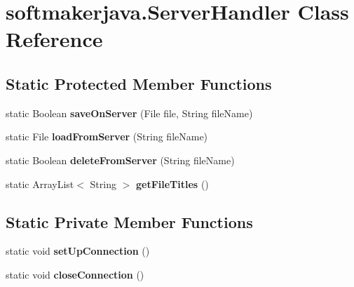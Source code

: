 \hypertarget{classsoftmakerjava_1_1_server_handler}{}\section{softmakerjava.\+Server\+Handler Class Reference}
\label{classsoftmakerjava_1_1_server_handler}
\subsection*{Static Protected Member Functions}
\begin{DoxyCompactItemize}
\item 
static Boolean {\bfseries save\+On\+Server} (File file, String file\+Name)\hypertarget{classsoftmakerjava_1_1_server_handler_a189f9439b9c3757851f903d68e38f9f8}{}\label{classsoftmakerjava_1_1_server_handler_a189f9439b9c3757851f903d68e38f9f8}

\item 
static File {\bfseries load\+From\+Server} (String file\+Name)\hypertarget{classsoftmakerjava_1_1_server_handler_ad4b1765682cc3f98aadd549892bd80df}{}\label{classsoftmakerjava_1_1_server_handler_ad4b1765682cc3f98aadd549892bd80df}

\item 
static Boolean {\bfseries delete\+From\+Server} (String file\+Name)\hypertarget{classsoftmakerjava_1_1_server_handler_a9e9a3bdc1b864c2cd596850531fa1c2e}{}\label{classsoftmakerjava_1_1_server_handler_a9e9a3bdc1b864c2cd596850531fa1c2e}

\item 
static Array\+List$<$ String $>$ {\bfseries get\+File\+Titles} ()\hypertarget{classsoftmakerjava_1_1_server_handler_a74c93c88f6cc0eb8b49c5423e864c874}{}\label{classsoftmakerjava_1_1_server_handler_a74c93c88f6cc0eb8b49c5423e864c874}

\end{DoxyCompactItemize}
\subsection*{Static Private Member Functions}
\begin{DoxyCompactItemize}
\item 
static void {\bfseries set\+Up\+Connection} ()\hypertarget{classsoftmakerjava_1_1_server_handler_a76dc38beb484cbe4bb361789e627e3fe}{}\label{classsoftmakerjava_1_1_server_handler_a76dc38beb484cbe4bb361789e627e3fe}

\item 
static void {\bfseries close\+Connection} ()\hypertarget{classsoftmakerjava_1_1_server_handler_a510669855864af0d1d6a564bc070343c}{}\label{classsoftmakerjava_1_1_server_handler_a510669855864af0d1d6a564bc070343c}

\end{DoxyCompactItemize}
